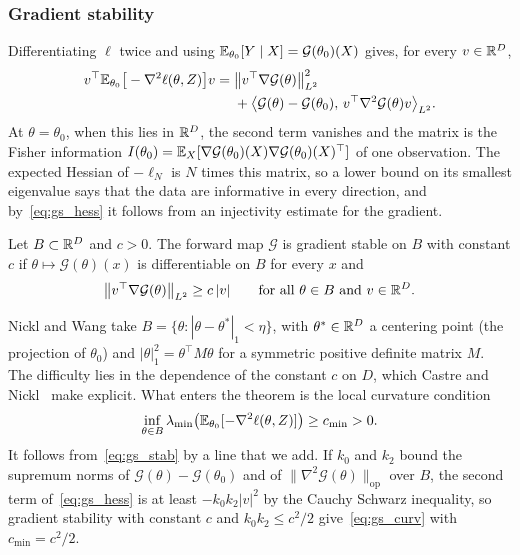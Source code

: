 \subsubsection{Gradient stability} Differentiating $\ell$ twice and using $\mathbb{E}_{\theta_0}[Y\mid X]=\mathcal{G}(\theta_0)(X)$ gives, for every $v\in\mathbb{R}^D$,
\begin{equation}\label{eq:gs_hess}
\begin{aligned}
v^\top\mathbb{E}_{\theta_0}\big[-\nabla^2\ell(\theta,Z)\big]v={}&\big\|v^\top\nabla\mathcal{G}(\theta)\big\|_{L^2}^2\\
&+\big\langle\mathcal{G}(\theta)-\mathcal{G}(\theta_0),\,v^\top\nabla^2\mathcal{G}(\theta)v\big\rangle_{L^2}.
\end{aligned}
\end{equation}
At $\theta=\theta_0$, when this lies in $\mathbb{R}^D$, the second term vanishes and the matrix is the Fisher information $I(\theta_0)=\mathbb{E}_X[\nabla\mathcal{G}(\theta_0)(X)\nabla\mathcal{G}(\theta_0)(X)^\top]$ of one observation. The expected Hessian of $-\ell_N$ is $N$ times this matrix, so a lower bound on its smallest eigenvalue says that the data are informative in every direction, and by~\eqref{eq:gs_hess} it follows from an injectivity estimate for the gradient.

\begin{definition}\label{def:gs_stab}
Let $B\subset\mathbb{R}^D$ and $c>0$. The forward map $\mathcal{G}$ is gradient stable on $B$ with constant $c$ if $\theta\mapsto\mathcal{G}(\theta)(x)$ is differentiable on $B$ for every $x$ and
\begin{equation}\label{eq:gs_stab}
\big\|v^\top\nabla\mathcal{G}(\theta)\big\|_{L^2}\ge c\,|v|\qquad\text{for all }\theta\in B\text{ and }v\in\mathbb{R}^D.
\end{equation}
\end{definition}

Nickl and Wang take $B=\{\theta:|\theta-\theta^*|_1<\eta\}$, with $\theta^*\in\mathbb{R}^D$ a centering point (the projection of $\theta_0$) and $|\theta|_1^2=\theta^\top M\theta$ for a symmetric positive definite matrix $M$. The difficulty lies in the dependence of the constant $c$ on $D$, which Castre and Nickl~\cite{castrenickl2026} make explicit. What enters the theorem is the local curvature condition
\begin{equation}\label{eq:gs_curv}
\inf_{\theta\in B}\lambda_{\min}\big(\mathbb{E}_{\theta_0}[-\nabla^2\ell(\theta,Z)]\big)\ge c_{\min}>0 .
\end{equation}
It follows from~\eqref{eq:gs_stab} by a line that we add. If $k_0$ and $k_2$ bound the supremum norms of $\mathcal{G}(\theta)-\mathcal{G}(\theta_0)$ and of $\|\nabla^2\mathcal{G}(\theta)\|_{\mathrm{op}}$ over $B$, the second term of~\eqref{eq:gs_hess} is at least $-k_0k_2|v|^2$ by the Cauchy Schwarz inequality, so gradient stability with constant $c$ and $k_0k_2\le c^2/2$ give~\eqref{eq:gs_curv} with $c_{\min}=c^2/2$.

